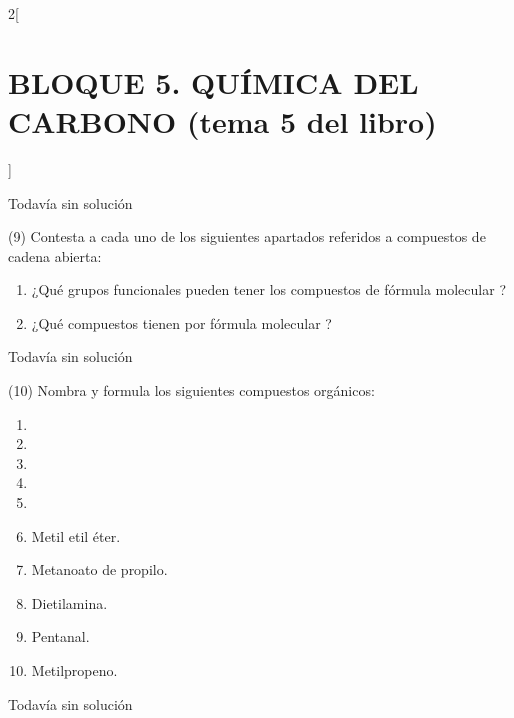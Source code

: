 \documentclass[10pt]{article}
\begin{document}
\begin{multicols}{2}[
  \section{BLOQUE 5. QUÍMICA DEL CARBONO (tema 5 del libro)}
  ]
\begin{solution}[print=false]
  Todavía sin solución
\end{solution}




\begin{exercise}[
    tags    = {},
    topics  = {química, química orgánica, orgánica},
    source  = {FQ 1B MGH 2016, p150, e9},
  ]
  (9) Contesta a cada uno de los siguientes apartados referidos a
  compuestos de cadena abierta:
  \begin{enumerate}
    \item ¿Qué grupos funcionales pueden tener los compuestos de
    fórmula molecular ?
    \item ¿Qué compuestos tienen por fórmula molecular ?
  \end{enumerate}
\end{exercise}

\begin{solution}[print=false]
  Todavía sin solución
\end{solution}




\begin{exercise}[
    tags    = {},
    topics  = {química, química orgánica, orgánica},
    source  = {FQ 1B MGH 2016, p150, e10},
  ]
  (10) Nombra y formula los siguientes compuestos orgánicos:
  \begin{enumerate}
    \item {}
    \item {}
    \item {}
    \item {}
    \item {}
    \item Metil etil éter.
    \item Metanoato de propilo.
    \item Dietilamina.
    \item Pentanal.
    \item Metilpropeno.
  \end{enumerate}
\end{exercise}

\begin{solution}[print=false]
  Todavía sin solución
\end{solution}





\end{multicols}
\end{document}
